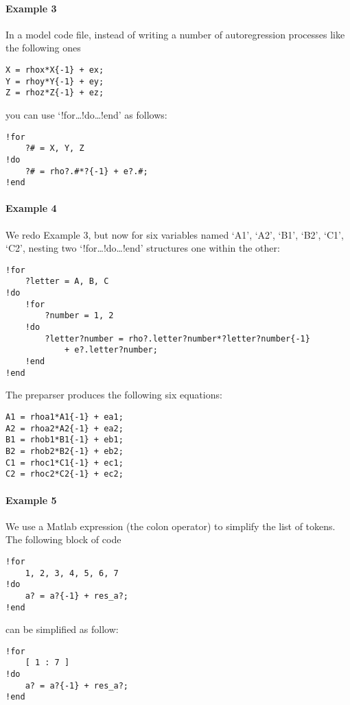 \paragraph{Example 3}\label{example-3}

In a model code file, instead of writing a number of autoregression
processes like the following ones

\begin{verbatim}
X = rhox*X{-1} + ex;
Y = rhoy*Y{-1} + ey;
Z = rhoz*Z{-1} + ez;
\end{verbatim}

you can use `!for\ldots{}!do\ldots{}!end' as follows:

\begin{verbatim}
!for
    ?# = X, Y, Z
!do
    ?# = rho?.#*?{-1} + e?.#;
!end
\end{verbatim}

\paragraph{Example 4}\label{example-4}

We redo Example 3, but now for six variables named `A1', `A2', `B1',
`B2', `C1', `C2', nesting two `!for\ldots{}!do\ldots{}!end' structures
one within the other:

\begin{verbatim}
!for
    ?letter = A, B, C
!do
    !for
        ?number = 1, 2
    !do
        ?letter?number = rho?.letter?number*?letter?number{-1}
            + e?.letter?number;
    !end
!end
\end{verbatim}

The preparser produces the following six equations:

\begin{verbatim}
A1 = rhoa1*A1{-1} + ea1;
A2 = rhoa2*A2{-1} + ea2;
B1 = rhob1*B1{-1} + eb1;
B2 = rhob2*B2{-1} + eb2;
C1 = rhoc1*C1{-1} + ec1;
C2 = rhoc2*C2{-1} + ec2;
\end{verbatim}

\paragraph{Example 5}\label{example-5}

We use a Matlab expression (the colon operator) to simplify the list of
tokens. The following block of code

\begin{verbatim}
!for
    1, 2, 3, 4, 5, 6, 7
!do
    a? = a?{-1} + res_a?;
!end
\end{verbatim}

can be simplified as follow:

\begin{verbatim}
!for
    [ 1 : 7 ]
!do
    a? = a?{-1} + res_a?;
!end
\end{verbatim}


